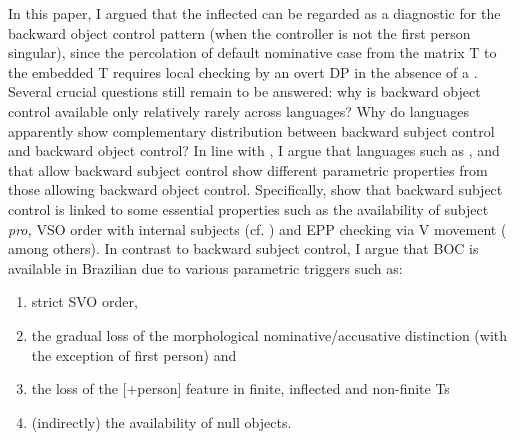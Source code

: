 \documentclass[output=paper]{langsci/langscibook}
\begin{document}
In this paper, I argued that the inflected  can be regarded as a diagnostic for the backward object control pattern (when the controller is not the first person singular), since the percolation of default nominative case from the matrix T to the embedded T requires local checking by an overt DP in the absence of a . Several crucial questions still remain to be answered: why is backward object control available only relatively rarely across languages? Why do languages apparently show complementary distribution between backward subject control and backward object control? In line with \citet{Alexiadou2010}, I argue that languages such as ,  and  that allow backward subject control show different parametric properties from those allowing backward object control. Specifically, \citet{Alexiadou2010} show that backward subject control is linked to some essential properties such as the availability of subject \textit{pro,} VSO order with internal subjects (cf. \citealt{Alexiadou2001Functional}) and EPP checking via V movement (\citealt{Alexiadou1998} among others). In contrast to backward subject control, I argue that BOC is available in Brazilian  due to various parametric triggers such as:

\begin{enumerate}
\item strict SVO order, 
\item the gradual loss of the morphological nominative\slash accusative distinction (with the exception of first person) and 
\item the loss of the [+person] feature in finite, inflected  and non-finite Ts
\item (indirectly) the availability of null objects. 
\end{enumerate}

{\sloppy\printbibliography[heading=subbibliography,notkeyword=this]}
\end{document}
